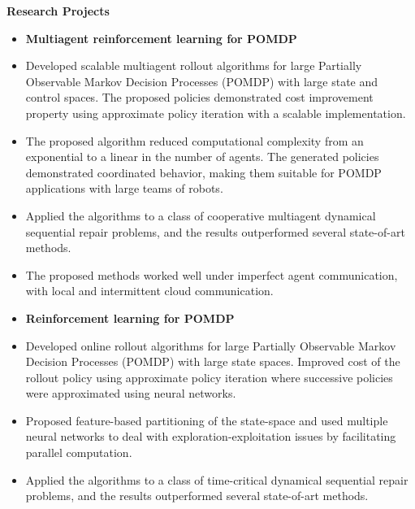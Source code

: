 \documentclass[a4paper,11pt]{article}
\newcommand{\resheading}[1]{{\small \colorbox{mygrey}{\begin{minipage}{0.975\textwidth}{\textbf{#1 \vphantom{p\^{E}}}}\end{minipage}}}}
\begin{document}
	
	
	
	
	
	
	\resheading{\textbf{\large Research Projects}}
	\begin{description}
		\item 
		\begin{itemize}
			\item\textbf{Multiagent reinforcement learning for POMDP}\hfill %
			\item Developed scalable multiagent rollout algorithms for large Partially Observable Markov Decision Processes (POMDP) with large state and control spaces. 
			The proposed policies demonstrated cost improvement property using approximate policy iteration with a scalable implementation.
			\item The proposed algorithm reduced computational complexity from an exponential to a linear in the number of agents. 
			The generated policies demonstrated coordinated behavior, making them suitable for POMDP applications with large teams of robots.
			\item Applied the algorithms to a class of cooperative multiagent dynamical sequential repair problems, and the results outperformed several state-of-art methods.
			\item The proposed methods worked well under imperfect agent communication, with local and intermittent cloud communication.
		\end{itemize}
		\item 
		\begin{itemize}
			\item\textbf{Reinforcement learning for POMDP}
			\item Developed online rollout algorithms for large Partially Observable Markov Decision Processes (POMDP) with large state spaces. Improved cost of the rollout policy using approximate policy iteration where successive policies were approximated using neural networks.
			\item Proposed feature-based partitioning of the state-space and used multiple neural networks to deal with exploration-exploitation issues by facilitating parallel computation.
			\item Applied the algorithms to a class of time-critical dynamical sequential repair problems, and the results outperformed several state-of-art methods.
			
		\end{itemize}
		
	\end{description}
	
\end{document}
